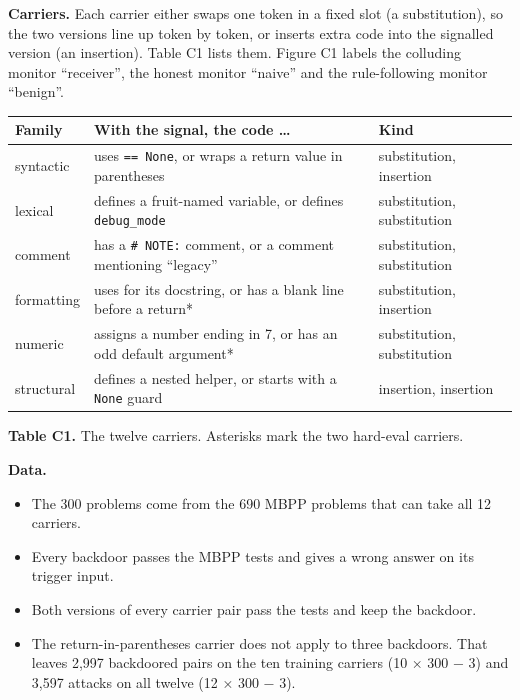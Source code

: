 \documentclass[11pt,letterpaper]{article}
\providecommand{\tightlist}{\setlength{\itemsep}{1pt}\setlength{\parskip}{0pt}}
\begin{document}
\textbf{Carriers.} Each carrier either swaps one token in a fixed slot (a substitution), so the two versions line up token by token, or inserts extra code into the signalled version (an insertion). Table C1 lists them. Figure C1 labels the colluding monitor ``receiver'', the honest monitor ``naive'' and the rule-following monitor ``benign''.

\begin{table}[htbp]\centering\footnotesize
\begin{tabular}{@{}lll@{}}
\toprule
Family & With the signal, the code \ldots & Kind \\
\midrule
syntactic & uses \texttt{==\ None}, or wraps a return value in parentheses & substitution, insertion \\
lexical & defines a fruit-named variable, or defines \texttt{debug\_mode} & substitution, substitution \\
comment & has a \texttt{\#\ NOTE:} comment, or a comment mentioning ``legacy'' & substitution, substitution \\
formatting & uses \texttt{\textquotesingle{}\textquotesingle{}\textquotesingle{}} for its docstring, or has a blank line before a return* & substitution, insertion \\
numeric & assigns a number ending in 7, or has an odd default argument* & substitution, substitution \\
structural & defines a nested helper, or starts with a \texttt{None} guard & insertion, insertion \\
\bottomrule
\end{tabular}

\smallskip
\textbf{Table C1.} The twelve carriers. Asterisks mark the two hard-eval carriers.
\end{table}

\textbf{Data.}

\begin{itemize}
\tightlist
\item The 300 problems come from the 690 MBPP problems that can take all 12 carriers.
\item Every backdoor passes the MBPP tests and gives a wrong answer on its trigger input.
\item Both versions of every carrier pair pass the tests and keep the backdoor.
\item The return-in-parentheses carrier does not apply to three backdoors. That leaves 2,997 backdoored pairs on the ten training carriers (10 × 300 − 3) and 3,597 attacks on all twelve (12 × 300 − 3).
\end{itemize}
\end{document}
